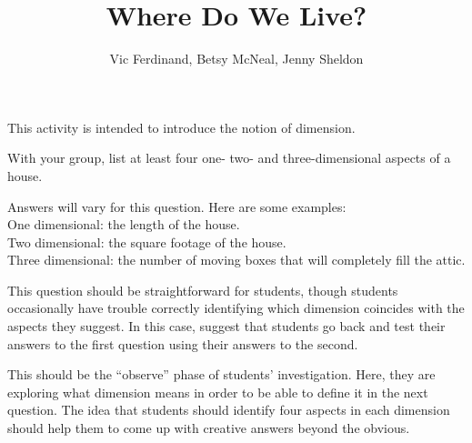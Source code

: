 \documentclass{ximera}
\title{Where Do We Live?}
\author{Vic Ferdinand, Betsy McNeal, Jenny Sheldon}
\begin{document}
\begin{abstract}
\end{abstract}


\maketitle

\begin{instructorIntro}
    This activity is intended to introduce the notion of dimension.  
    
    
\end{instructorIntro}

\begin{problem}
    With your group, list at least four one- two- and three-dimensional aspects of a house.
    
    \begin{solution}
        Answers will vary for this question.  Here are some examples:\\
        One dimensional: the length of the house.\\
        Two dimensional: the square footage of the house.\\
        Three dimensional: the number of moving boxes that will completely fill the attic.
    \end{solution}
    
    \begin{instructorNotes}
        This question should be straightforward for students, though students occasionally have trouble correctly identifying which dimension coincides with the aspects they suggest.  In this case, suggest that students go back and test their answers to the first question using their answers to the second.
        
        This should be the ``observe'' phase of students' investigation.  Here, they are exploring what dimension means in order to be able to define it in the next question.  The idea that students should identify four aspects in each dimension should help them to come up with creative answers beyond the obvious.
    \end{instructorNotes}
\end{problem}
\end{document}
